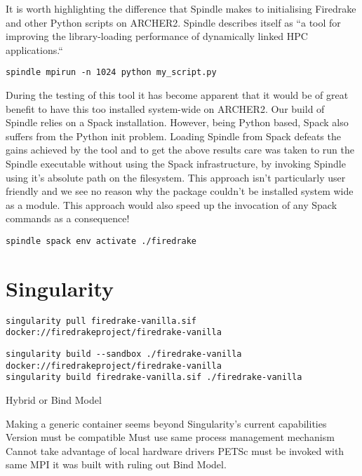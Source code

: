 \documentclass[a4paper,11pt]{article}
\begin{document}
It is worth highlighting the difference that Spindle makes to initialising Firedrake and other Python scripts on ARCHER2.
Spindle describes itself as ``a tool for improving the library-loading performance of dynamically linked HPC applications.`` 

\begin{lstlisting}
spindle mpirun -n 1024 python my_script.py
\end{lstlisting}

During the testing of this tool it has become apparent that it would be of great benefit to have this too installed system-wide on ARCHER2.
Our build of Spindle relies on a Spack installation.
However, being Python based, Spack also suffers from the Python init problem.
Loading Spindle from Spack defeats the gains achieved by the tool and to get the above results care was taken to run the Spindle executable without using the Spack infrastructure, by invoking Spindle using it's absolute path on the filesystem.
This approach isn't particularly user friendly and we see no reason why the package couldn't be installed system wide as a module.
This approach would also speed up the invocation of any Spack commands as a consequence!

\begin{lstlisting}
spindle spack env activate ./firedrake
\end{lstlisting}


\clearpage
\section{Singularity}
\label{sec:singularity}
\begin{lstlisting}
singularity pull firedrake-vanilla.sif docker://firedrakeproject/firedrake-vanilla
\end{lstlisting}

\begin{lstlisting}
singularity build --sandbox ./firedrake-vanilla docker://firedrakeproject/firedrake-vanilla
singularity build firedrake-vanilla.sif ./firedrake-vanilla
\end{lstlisting}

Hybrid or Bind Model

Making a generic container seems beyond Singularity's current capabilities
Version must be compatible
Must use same process management mechanism
Cannot take advantage of local hardware drivers
PETSc must be invoked with same MPI it was built with ruling out Bind Model.
\end{document}
